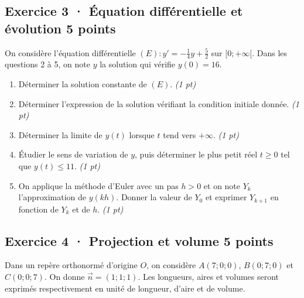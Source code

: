 \clearpage{}\par

\subsection*{Exercice 3 · Équation différentielle et évolution \hfill 5 points}On considère l'équation différentielle $(E):y'=-\frac1{4}y+\frac{5}{2}$ sur $[0;+\infty[$. Dans les questions 2 à 5, on note $y$ la solution qui vérifie $y(0)=16$.

\begin{enumerate}

\item Déterminer la solution constante de $(E)$. \hfill\textit{(1 pt)}

\item Déterminer l'expression de la solution vérifiant la condition initiale donnée. \hfill\textit{(1 pt)}

\item Déterminer la limite de $y(t)$ lorsque $t$ tend vers $+\infty$. \hfill\textit{(1 pt)}

\item Étudier le sens de variation de $y$, puis déterminer le plus petit réel $t\ge0$ tel que $y(t)\le11$. \hfill\textit{(1 pt)}

\item On applique la méthode d'Euler avec un pas $h>0$ et on note $Y_k$ l'approximation de $y(kh)$. Donner la valeur de $Y_0$ et exprimer $Y_{k+1}$ en fonction de $Y_k$ et de $h$. \hfill\textit{(1 pt)}

\end{enumerate}

\subsection*{Exercice 4 · Projection et volume \hfill 5 points}Dans un repère orthonormé d'origine $O$, on considère $A(7;0;0)$, $B(0;7;0)$ et $C(0;0;7)$. On donne $\vec n=(1;1;1)$. Les longueurs, aires et volumes seront exprimés respectivement en unité de longueur, d'aire et de volume.

